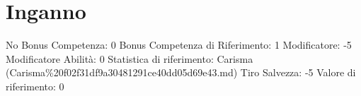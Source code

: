 \section{Inganno}\label{inganno}

\begin{description}
\tightlist
\item[Tags: ABI]
No Bonus Competenza: 0 Bonus Competenza di Riferimento: 1 Modificatore:
-5 Modificatore Abilità: 0 Statistica di riferimento: Carisma
(Carisma\%20f02f31df9a30481291ce40dd05d69e43.md) Tiro Salvezza: -5
Valore di riferimento: 0
\end{description}
